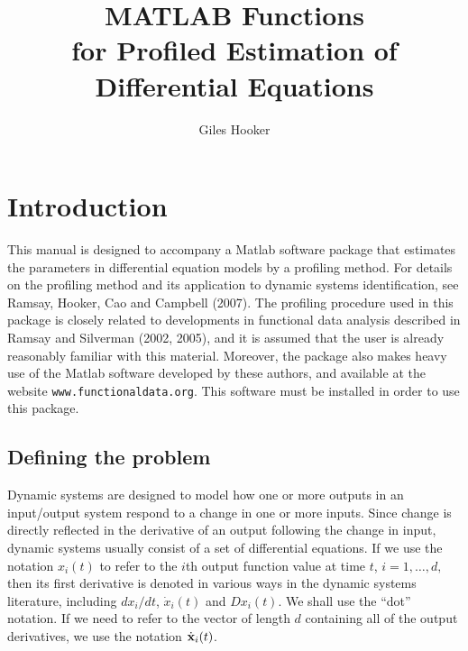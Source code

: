 \documentclass{article}
\newcommand{\xbold}    {\mbox{\bf x}}
\begin{document}
\title{ MATLAB Functions \\
             for
        Profiled Estimation
              of \\
       Differential Equations }

\author{Giles Hooker}

\maketitle

\tableofcontents


\section{Introduction}

This manual is designed to accompany a Matlab software package that estimates the parameters in
differential equation models by a profiling method.  For details on the profiling method and its
application to dynamic systems identification, see Ramsay, Hooker, Cao and Campbell (2007).  The
profiling procedure used in this package is closely related to developments in functional data
analysis described in Ramsay and Silverman (2002, 2005), and it is assumed that the user is already
reasonably familiar with this material.  Moreover, the package also makes heavy use of the Matlab
software developed by these authors, and available at the website \texttt{www.functionaldata.org}.
This software must be installed in order to use this package.

\subsection{Defining the problem}

Dynamic systems are designed to model how one or more outputs in an input/output system respond to
a change in one or more inputs. Since change is directly reflected in the derivative of an output
following the change in input, dynamic systems usually consist of a set of differential equations.
If we use the notation $x_i(t)$ to refer to the $i$th output function value at time $t$,
$i=1,\ldots,d,$ then its first derivative is denoted in various ways in the dynamic systems
literature, including $dx_i/dt$, $\dot{x}_i(t)$ and $Dx_i(t)$.  We shall use the ``dot'' notation.
If we need to refer to the vector of length $d$ containing all of the output derivatives, we use
the notation $\dot{\xbold}_i(t)$.
\end{document}
